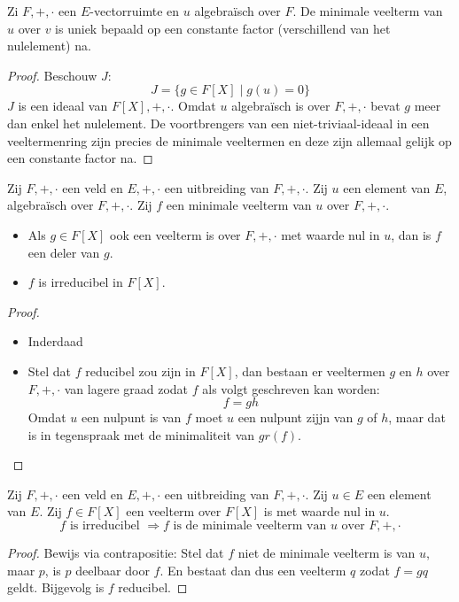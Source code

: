 \documentclass[main.tex]{subfiles}
\begin{document}
\begin{pr}
  \label{pr:minimale-veelterm-uniek}
  Zi $F,+,\cdot$ een $E$-vectorruimte en $u$ algebra\"isch over $F$.
  De minimale veelterm van $u$ over $v$ is uniek bepaald op een constante factor (verschillend van het nulelement) na.

  \begin{proof}
    Beschouw $J$:
    \[ J = \{ g\in F[X] \mid g(u) = 0 \} \]
    $J$ is een ideaal van $F[X],+,\cdot$.
    Omdat $u$ algebra\"isch is over $F,+,\cdot$ bevat $g$ meer dan enkel het nulelement.
    De voortbrengers van een niet-triviaal-ideaal in een veeltermenring zijn precies de minimale veeltermen  en deze zijn allemaal gelijk op een constante factor na.
  \end{proof}
\end{pr}

\begin{ei}
  \label{ei:minimale-veelterm-uniek-en-irreducibel}
  Zij $F,+,\cdot$ een veld en $E,+,\cdot$ een uitbreiding van $F,+,\cdot$.
  Zij $u$ een element van $E$, algebra\"isch over $F,+,\cdot$.
  Zij $f$ een minimale veelterm van $u$ over $F,+,\cdot$.
  \begin{itemize}
  \item Als $g \in F[X]$ ook een veelterm is over $F,+,\cdot$ met waarde nul in $u$, dan is $f$ een deler van $g$.
  \item $f$ is irreducibel in $F[X]$.
  \end{itemize}

  \begin{proof}
    \begin{itemize}
    \item Inderdaad
    \item Stel dat $f$ reducibel zou zijn in $F[X]$, dan bestaan er veeltermen $g$ en $h$ over $F,+,\cdot$ van lagere graad zodat $f$ als volgt geschreven kan worden:
      \[ f = gh \]
      Omdat $u$ een nulpunt is van $f$ moet $u$ een nulpunt zijjn van $g$ of $h$, maar dat is in tegenspraak met de minimaliteit van $gr(f)$.
    \end{itemize}
  \end{proof}
\end{ei}

\begin{ei}
  Zij $F,+,\cdot$ een veld en $E,+,\cdot$ een uitbreiding van $F,+,\cdot$.
  Zij $u\in E$ een element van $E$.
  Zij $f\in F[X]$ een veelterm over $F[X]$ is met waarde nul in $u$.
  \[ f \text{ is irreducibel } \Rightarrow f \text{ is de minimale veelterm van } u \text{ over } F,+,\cdot \]

  \begin{proof}
    Bewijs via contrapositie:
    Stel dat $f$ niet de minimale veelterm is van $u$, maar $p$, is $p$ deelbaar door $f$. En bestaat dan dus een veelterm $q$ zodat $f=gq$ geldt.
    Bijgevolg is $f$ reducibel.
  \end{proof}
\end{ei}
\end{document}

